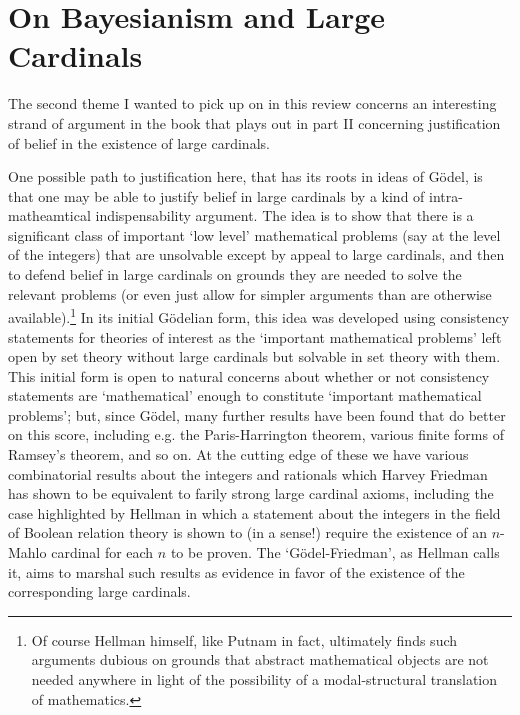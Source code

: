 \documentclass{amsart}
\theoremstyle{definition}
\begin{document}
\section{On Bayesianism and Large Cardinals}

The second theme I wanted to pick up on in this review concerns an interesting
strand of argument in the book that plays out in part II concerning justification
of belief in the existence of large cardinals. 

One possible path to justification here, that has its roots in ideas of G\"odel, 
is that one may be able to justify belief in large cardinals by 
a kind of intra-matheamtical indispensability argument. The idea is to show that there
is a significant class of important `low level' mathematical problems 
(say at the level of the integers) that are unsolvable except
by appeal to large cardinals, and then to defend belief in large cardinals 
on grounds they are needed to solve the relevant problems (or even just 
allow for simpler arguments than are otherwise available).\footnote{
    Of course Hellman himself, like Putnam in fact, 
    ultimately finds such arguments dubious on grounds 
    that abstract mathematical objects are not needed anywhere
    in light of the possibility of a modal-structural translation 
    of mathematics.
} 
In its initial G\"odelian form, this idea was developed using consistency statements 
for theories of interest as the `important mathematical problems' left open by set theory
without large cardinals but solvable in set theory with them. This initial form is 
open to natural concerns about whether or not consistency statements are `mathematical'
enough to constitute `important mathematical problems'; but, since G\"odel,
many further results have been found that do better on this score, including e.g. the 
Paris-Harrington theorem, various finite forms of Ramsey's theorem, and so on. At the 
cutting edge of these we have various combinatorial results about the integers and rationals
which Harvey Friedman has shown to be equivalent to farily strong large cardinal 
axioms, including the case highlighted by Hellman in which a statement about the integers 
in the field of Boolean relation theory is shown to (in a sense!) require the existence 
of an $n$-Mahlo cardinal for each $n$ to be proven.
The `G\"odel-Friedman', as Hellman 
calls it, aims to marshal such results as evidence in favor of the existence 
of the corresponding large cardinals.
\end{document}
